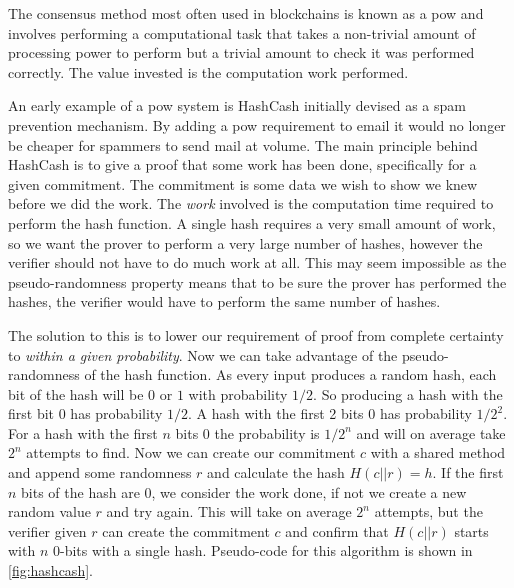 The consensus method most often used in blockchains is known as a \gls{pow} and involves performing a computational task that takes a non-trivial amount of processing power to perform but a trivial amount to check it was performed correctly. The value invested is the computation work performed.

An early example of a \gls{pow} system is HashCash \cite{backHashcashDenialService2002} initially devised as a spam prevention mechanism. By adding a \gls{pow} requirement to email it would no longer be cheaper for spammers to send mail at volume. The main principle behind HashCash is to give a proof that some work has been done, specifically for a given commitment. The commitment is some data we wish to show we knew before we did the work. The \emph{work} involved is the computation time required to perform the hash function. A single hash requires a very small amount of work, so we want the prover to perform a very large number of hashes, however the verifier should not have to do much work at all. This may seem impossible as the pseudo-randomness property means that to be sure the prover has performed the hashes, the verifier would have to perform the same number of hashes.

The solution to this is to lower our requirement of proof from complete certainty to \emph{within a given probability}. Now we can take advantage of the pseudo-randomness of the hash function. As every input produces a random hash, each bit of the hash will be $0$ or $1$ with probability $1/2$. So producing a hash with the first bit $0$ has probability $1/2$. A hash with the first 2 bits $0$ has probability $1/2^2$. For a hash with the first $n$ bits $0$ the probability is $1/2^n$ and will on average take $2^n$ attempts to find. Now we can create our commitment $c$ with a shared method and append some randomness $r$ and calculate the hash $H(c || r) = h$. If the first $n$ bits of the hash are 0, we consider the work done, if not we create a new random value $r$ and try again. This will take on average $2^n$ attempts, but the verifier given $r$ can create the commitment $c$ and confirm that $H(c || r)$ starts with $n$ 0-bits with a single hash. Pseudo-code for this algorithm is shown in \autoref{fig:hashcash}.

